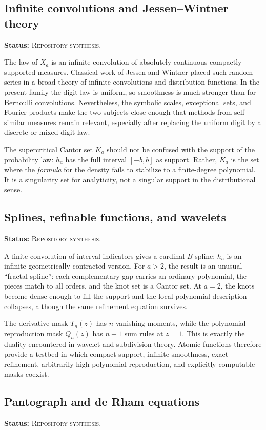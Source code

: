 \documentclass[11pt]{article}
\theoremstyle{definition}
\theoremstyle{remark}
\newcommand{\RepoStatus}{\textcolor{RepoOlive}{\textsc{Repository synthesis}}}
\newcommand{\status}[1]{\par\smallskip\noindent\textbf{Status:} #1.\par\smallskip}
\begin{document}
\subsection{Infinite convolutions and Jessen--Wintner theory}
\status{\RepoStatus}

The law of \(X_a\) is an infinite convolution of absolutely continuous compactly supported measures.  Classical work of Jessen and Wintner placed such random series in a broad theory of infinite convolutions and distribution functions.  In the present family the digit law is uniform, so smoothness is much stronger than for Bernoulli convolutions.  Nevertheless, the symbolic scales, exceptional sets, and Fourier products make the two subjects close enough that methods from self-similar measures remain relevant, especially after replacing the uniform digit by a discrete or mixed digit law.

The supercritical Cantor set \(K_a\) should not be confused with the support of the probability law: \(h_a\) has the full interval \([-b,b]\) as support.  Rather, \(K_a\) is the set where the \emph{formula} for the density fails to stabilize to a finite-degree polynomial.  It is a singularity set for analyticity, not a singular support in the distributional sense.

\subsection{Splines, refinable functions, and wavelets}
\status{\RepoStatus}

A finite convolution of interval indicators gives a cardinal \(B\)-spline; \(h_a\) is an infinite geometrically contracted version.  For \(a>2\), the result is an unusual ``fractal spline'': each complementary gap carries an ordinary polynomial, the pieces match to all orders, and the knot set is a Cantor set.  At \(a=2\), the knots become dense enough to fill the support and the local-polynomial description collapses, although the same refinement equation survives.

The derivative mask \(T_n(z)\) has \(n\) vanishing moments, while the polynomial-reproduction mask \(Q_n(z)\) has \(n+1\) sum rules at \(z=1\).  This is exactly the duality encountered in wavelet and subdivision theory.  Atomic functions therefore provide a testbed in which compact support, infinite smoothness, exact refinement, arbitrarily high polynomial reproduction, and explicitly computable masks coexist.

\subsection{Pantograph and de Rham equations}
\status{\RepoStatus}
\end{document}
